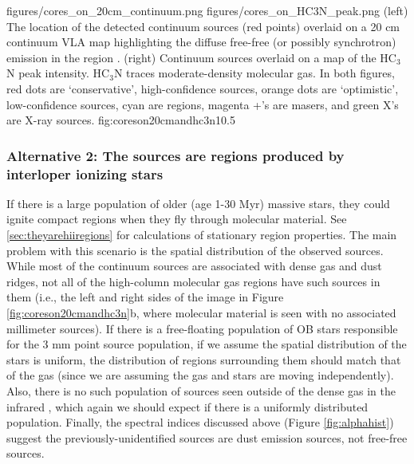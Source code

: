 \documentclass[twocolumn]{aastex61}
\begin{document}

%

\FigureTwo
{figures/cores_on_20cm_continuum.png}
{figures/cores_on_HC3N_peak.png}
{(left) The location of the detected continuum sources (red points) overlaid on a 20
cm continuum VLA map highlighting the diffuse free-free (or possibly
synchrotron) emission in the region \citep{Yusef-Zadeh2004a}.
(right) Continuum sources overlaid on a map
of the HC$_3$N peak intensity.  HC$_3$N traces moderate-density molecular gas.
In both figures, red dots are `conservative', high-confidence sources,
orange dots are `optimistic', low-confidence sources,
cyan are \hii regions, magenta +'s are masers, and green X's are X-ray sources.
}
{fig:coreson20cmandhc3n}{1}{0.5\textwidth}

\subsubsection{Alternative 2: The sources are \hii regions produced by
interloper ionizing stars}
If there is a large population of older (age 1-30 Myr) massive stars, they could
ignite compact \hii regions when they fly through molecular material.  See
\ref{sec:theyarehiiregions} for calculations of stationary \hii region
properties.  The main problem with this scenario is the spatial distribution of
the observed sources.  While most of the continuum sources are associated with
dense gas and dust ridges, not all of the high-column molecular gas regions
have such sources in them (i.e., the left and right sides of the image in
Figure \ref{fig:coreson20cmandhc3n}b, where molecular material is seen with no
associated millimeter sources).  If there is a free-floating population of OB
stars responsible for the 3 mm point source population, if we assume the
spatial distribution of the stars is uniform, the distribution of \hii regions
surrounding them should match that of the gas (since we are assuming the gas and
stars are moving independently).  Also, there is no such population of sources
seen outside of the dense gas in the infrared \citep[TODO: Who has done
infrared studies of Sgr B2?  You can infer what I have stated `by inspection'
of 2MASS, but it would be more straightforward to quote someone else][]{},
which again we should expect if there is a uniformly distributed population.
Finally, the spectral indices discussed above (Figure \ref{fig:alphahist})
suggest the previously-unidentified sources are dust emission sources, not
free-free sources.
\end{document}
